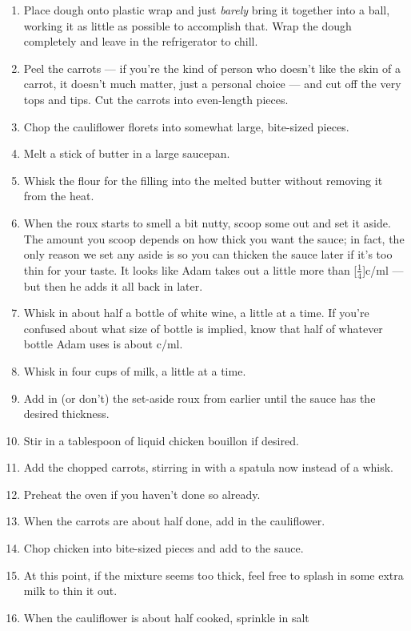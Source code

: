 \documentclass{book}
\begin{document}
\begin{recipe}
{\begin{enumerate}
			\item Place dough onto plastic wrap and just \emph{barely} bring it
				together into a ball, working it as little as possible to
				accomplish that. Wrap the dough completely and leave in the
				refrigerator to chill.
			\item Peel the carrots --- if you're the kind of person who doesn't
				like the skin of a carrot, it doesn't much matter, just a
				personal choice --- and cut off the very tops and tips. Cut the
				carrots into even-length pieces.
			\item Chop the cauliflower florets into somewhat large, bite-sized
				pieces.
			\item Melt a stick of butter in a large saucepan.
			\item Whisk the flour for the filling into the melted butter without
				removing it from the heat.
			\item When the roux starts to smell a bit nutty, scoop some out and
				set it aside. The amount you scoop depends on how thick you want
				the sauce; in fact, the only reason we set any aside is so you
				can thicken the sauce later if it's too thin for your taste. It
				looks like Adam takes out a little more than
				\unit[$\frac{1}{4}$]{c}/\unit[50]{ml} --- but then he adds it all
				back in later.
			\item Whisk in about half a bottle of white wine, a little at a
				time. If you're confused about what size of bottle is implied,
				know that half of whatever bottle Adam uses is about
				\unit[2]{c}/\unit[500]{ml}.
			\item Whisk in four cups of milk, a little at a time.
			\item Add in (or don't) the set-aside roux from earlier until the
				sauce has the desired thickness.
			\item Stir in a tablespoon of liquid chicken bouillon if desired.
			\item Add the chopped carrots, stirring in with a spatula now
				instead of a whisk.
			\item Preheat the oven if you haven't done so already.
			\item When the carrots are about half done, add in the cauliflower.
			\item Chop chicken into bite-sized pieces and add to the sauce.
			\item At this point, if the mixture seems too thick, feel free to
				splash in some extra milk to thin it out.
			\item When the cauliflower is about half cooked, sprinkle in salt

\end{enumerate}}
\end{recipe}
\end{document}
